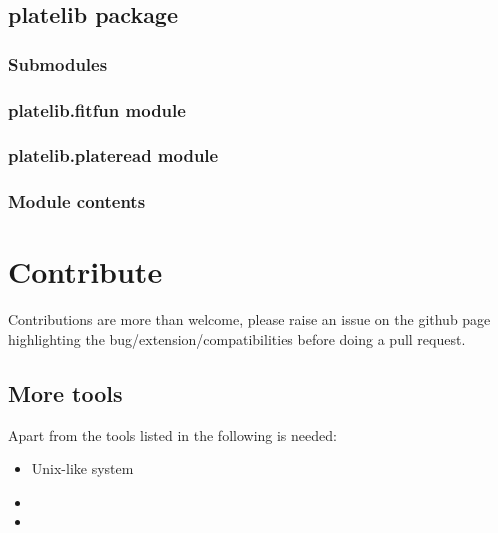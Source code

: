 \documentclass[letterpaper,10pt,english]{sphinxmanual}
\begin{document}
\section{platelib package}
\label{\detokenize{platelib:platelib-package}}\label{\detokenize{platelib::doc}}

\subsection{Submodules}
\label{\detokenize{platelib:submodules}}

\subsection{platelib.fitfun module}
\label{\detokenize{platelib:platelib-fitfun-module}}

\subsection{platelib.plateread module}
\label{\detokenize{platelib:platelib-plateread-module}}

\subsection{Module contents}
\label{\detokenize{platelib:module-contents}}

\chapter{Contribute}
\label{\detokenize{contribute:contribute}}\label{\detokenize{contribute::doc}}
Contributions are more than welcome, please raise an issue on the github page
highlighting the bug/extension/compatibilities before doing a pull request.


\section{More tools}
\label{\detokenize{contribute:more-tools}}
Apart from the tools listed in {\hyperref[\detokenize{install:installation}]{}} the following is needed:
\begin{itemize}
\item {} 
Unix-like system

\item {} 

\item {} 

\end{itemize}
\end{document}
